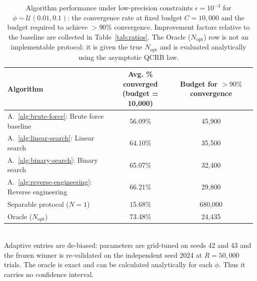 \begin{table}[ht]
\centering
\caption{Algorithm performance under low-precision constraints $\epsilon=10^{-3}$ for $\phi\sim\mathcal{U}(0.01,0.1)$: the convergence rate at fixed budget $C=10{,}000$ and the budget required to achieve \(>90\%\) convergence. Improvement factors relative to the baseline are collected in Table~\ref{tab:ratios}. The Oracle ($N_\text{opt}$) row is not an implementable protocol: it is given the true $N_\text{opt}$ and is evaluated analytically using the asymptotic QCRB law.}
\label{tab:summary-low-prec}
\begin{tabular}{lcc}
\toprule
Algorithm
& \makecell{Avg. \% converged \\ (budget = 10{,}000)}
& \makecell{Budget for $>90\%$ \\ convergence} \\
\midrule
A.~\ref{alg:brute-force}: Brute force baseline
& 56.09\%
& 45{,}900 \\
A.~\ref{alg:linear-search}: Linear search
& 64.10\%
& 35{,}500 \\
A.~\ref{alg:binary-search}: Binary search
& 65.07\%
& 32{,}400 \\
A.~\ref{alg:reverse-engineering}: Reverse engineering
& 66.21\%
& 29{,}800 \\
\midrule
Separable protocol ($N=1$)
& 15.68\%
& 680{,}000 \\
\midrule
Oracle ($N_\text{opt}$)
& 73.48\%
& 24{,}435 \\
\bottomrule
\end{tabular}
\\[2pt]
\footnotesize Adaptive entries are de-biased: parameters are grid-tuned on seeds 42 and 43 and the frozen winner is re-validated on the independent seed 2024 at $R=50{,}000$ trials. The oracle is exact and can be calculated analytically for each $\phi$. Thus it carries no confidence interval.
\end{table}
